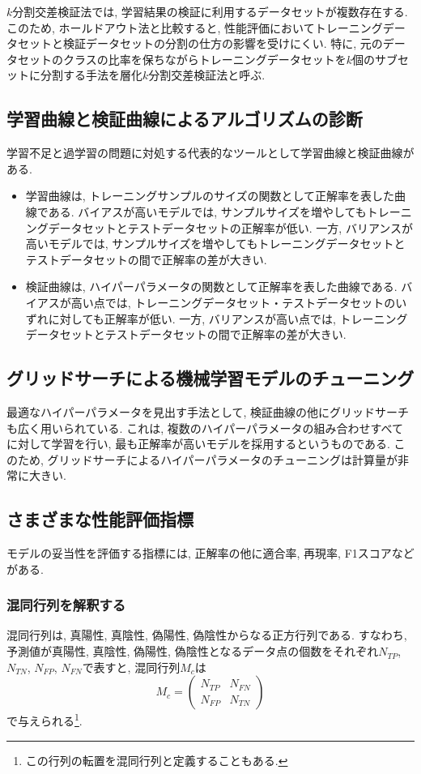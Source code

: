 \documentclass[uplatex]{jsarticle}
\theoremstyle{definition}
\numberwithin{equation}{section}
\begin{document}
$k$分割交差検証法では, 学習結果の検証に利用するデータセットが複数存在する.
このため, ホールドアウト法と比較すると, 性能評価においてトレーニングデータセットと検証データセットの分割の仕方の影響を受けにくい.
特に, 元のデータセットのクラスの比率を保ちながらトレーニングデータセットを$k$個のサブセットに分割する手法を層化$k$分割交差検証法と呼ぶ.

\subsection{学習曲線と検証曲線によるアルゴリズムの診断}
学習不足と過学習の問題に対処する代表的なツールとして学習曲線と検証曲線がある.
\begin{itemize}
    \item
    学習曲線は, トレーニングサンプルのサイズの関数として正解率を表した曲線である.
    バイアスが高いモデルでは, サンプルサイズを増やしてもトレーニングデータセットとテストデータセットの正解率が低い.
    一方, バリアンスが高いモデルでは, サンプルサイズを増やしてもトレーニングデータセットとテストデータセットの間で正解率の差が大きい.

    \item
    検証曲線は, ハイパーパラメータの関数として正解率を表した曲線である.
    バイアスが高い点では, トレーニングデータセット・テストデータセットのいずれに対しても正解率が低い.
    一方, バリアンスが高い点では, トレーニングデータセットとテストデータセットの間で正解率の差が大きい.
\end{itemize}

\subsection{グリッドサーチによる機械学習モデルのチューニング}
最適なハイパーパラメータを見出す手法として, 検証曲線の他にグリッドサーチも広く用いられている.
これは, 複数のハイパーパラメータの組み合わせすべてに対して学習を行い, 最も正解率が高いモデルを採用するというものである.
このため, グリッドサーチによるハイパーパラメータのチューニングは計算量が非常に大きい.

\subsection{さまざまな性能評価指標}
モデルの妥当性を評価する指標には, 正解率の他に適合率, 再現率, F1スコアなどがある.

\subsubsection{混同行列を解釈する}
混同行列は, 真陽性, 真陰性, 偽陽性, 偽陰性からなる正方行列である.
すなわち, 予測値が真陽性, 真陰性, 偽陽性, 偽陰性となるデータ点の個数をそれぞれ$N_{TP}$, $N_{TN}$, $N_{FP}$, $N_{FN}$で表すと, 混同行列$M_{c}$は
\begin{equation}
    M_{c} = \begin{pmatrix}
        N_{TP} & N_{FN} \\
        N_{FP} & N_{TN}
    \end{pmatrix}
\end{equation}
で与えられる\footnote{この行列の転置を混同行列と定義することもある.}.
\end{document}
